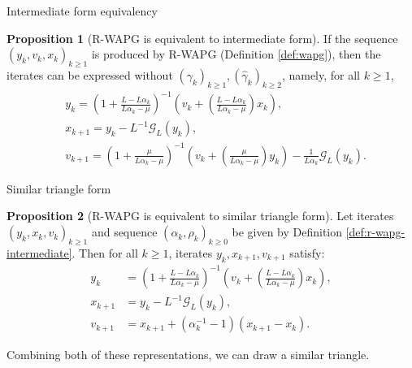 \documentclass[11pt]{beamer}
\theoremstyle{definition}
\newtheorem{proposition}{Proposition}[section]
\begin{document}
        \begin{frame}{Intermediate form equivalency}
            \begin{proposition}[R-WAPG is equivalent to intermediate form]\label{prop:wapg-first-equivalent-repr}
                If the sequence $(y_k, v_k, x_k)_{k \ge 1}$ is produced by R-WAPG (Definition \ref{def:wapg}),
                then the iterates can be expressed without $(\gamma_k)_{k \ge1},(\hat \gamma_k)_{k \ge 2}$,  namely, for all $k\ge 1$,
                \begin{align}
                    & y_{k} =
                    \left(
                        1 + \frac{L - L\alpha_{k}}{L\alpha_{k} - \mu}
                    \right)^{-1}
                    \left(
                        v_{k} +
                        \left(\frac{L - L\alpha_{k}}{L\alpha_{k} - \mu} \right) x_{k}
                    \right), 
                    \\
                    & x_{k + 1} =
                    y_k - L^{-1} \mathcal G_L (y_k),
                    \\
                    & v_{k + 1} =
                    \left(
                        1 + \frac{\mu}{L \alpha_k - \mu}
                    \right)^{-1}
                    \left(
                        v_k +
                        \left(\frac{\mu}{L \alpha_k - \mu}\right) y_k
                    \right) - \frac{1}{L\alpha_{k}}\mathcal G_L (y_k).
                \end{align}
            \end{proposition}
        \end{frame}
        \begin{frame}{Similar triangle form}
            \begin{proposition}[R-WAPG is equivalent to similar triangle form]\label{prop:wagp-st-form}
                Let iterates $(y_k, x_{k}, v_{k})_{k \ge 1}$ and sequence $(\alpha_k, \rho_k)_{k \ge 0}$ be given by Definition \ref{def:r-wapg-intermediate}.
                Then for all $k \ge 1$, iterates $y_k, x_{k + 1}, v_{k + 1}$
                satisfy:
                \begin{align}
                    y_{k} &=
                    \left(
                        1 + \frac{L - L\alpha_{k}}{L\alpha_{k} - \mu}
                    \right)^{-1}
                    \left(
                        v_{k} +
                        \left(\frac{L - L\alpha_{k}}{L\alpha_{k} - \mu} \right) x_{k}
                    \right),
                    \label{eqn:rwapg-st-form-eqn-1}
                    \\
                    x_{k + 1} &=
                    y_k - L^{-1} \mathcal G_L (y_k),
                    \\
                    v_{k + 1} &= x_{k + 1} + (\alpha_k^{-1} - 1)(x_{k + 1} - x_k).
                    \label{eqn:rwapg-st-form-eqn-3}
                \end{align}
            \end{proposition}
            Combining both of these representations, we can draw a similar triangle. 
        \end{frame}
\end{document}
